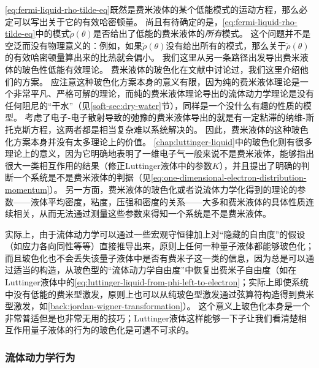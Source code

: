 \eqref{eq:fermi-liquid-rho-tilde-eq}既然是费米液体的某个低能模式的运动方程，那么必定可以写出关于它的有效哈密顿量。
尚且有待确定的是，\eqref{eq:fermi-liquid-rho-tilde-eq}中的模式$\tilde{\rho}(\theta)$是否给出了低能的费米液体的\emph{所有}模式。
这个问题并不是空泛而没有物理意义的：例如，如果$\tilde{\rho}(\theta)$没有给出所有的模式，那么关于$\tilde{\rho}(\theta)$的有效哈密顿量算出来的比热就会偏小。
我们这里从另一条路径出发导出费米液体的玻色性低能有效理论。
费米液体的玻色化在文献\cite{haldane-boson, Castro_Neto_1994,wen-qft}中讨论过，我们这里介绍他们的方案。
应注意这种玻色化方案本身的意义有限，因为纯的费米液体理论是一个非常平凡、严格可解的理论，而纯的费米液体理论导出的流体动力学理论是没有任何阻尼的“干水”（见\ref{soft-sec:dry-water}节），同样是一个没什么有趣的性质的模型。
考虑了电子-电子散射导致的弛豫的费米液体导出的就是有一定粘滞的纳维-斯托克斯方程，这两者都是相当复杂难以系统解决的。
因此，费米液体的这种玻色化方案本身并没有太多理论上的价值。
\autoref{chap:luttinger-liquid}中的玻色化则有很多理论上的意义，因为它明确地表明了一维电子气一般来说不是费米液体，能够指出很大一类相互作用的结果（修正Luttinger液体中的参数$K$），并且提出了明确的判断一个系统是不是费米液体的判据（见\eqref{eq:one-dimensional-electron-distribution-momentum}）。
另一方面，费米液体的玻色化或者说流体力学化得到的理论的参数——液体平均密度，粘度，压强和密度的关系——大多和费米液体的具体性质连续相关，从而无法通过测量这些参数来得知一个系统是不是费米液体。

实际上，由于流体动力学可以通过一些宏观守恒律加上对“隐藏的自由度”的假设（如应力各向同性等等）直接推导出来，原则上任何一种量子液体都能够玻色化；而且玻色化也不会丢失该量子液体中是否有费米子这一类的信息，因为总是可以通过适当的构造，从玻色型的“流体动力学自由度”中恢复出费米子自由度（如在Luttinger液体中的\eqref{eq:luttinger-liquid-from-phi-left-to-electron}；实际上即使系统中没有低能的费米型激发，原则上也可以从纯玻色型激发通过弦算符构造得到费米型激发，如\autoref{back:jordan-wigner-transformation}）。
这个意义上玻色化本身是一个非常普适但是也非常无用的技巧；Luttinger液体这样能够一下子让我们看清楚相互作用量子液体的行为的玻色化是可遇不可求的。

\subsubsection{流体动力学行为}


